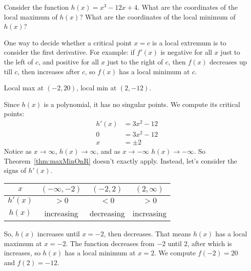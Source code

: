 
\begin{Mquestion}[2015Q]\label{s3.5.3firstderivfirst}
Consider the function $h(x)=x^3-12x+4$.
What are the coordinates of the local maximum of $h(x)$? What are the coordinates of the local minimum of $h(x)$?
\end{Mquestion}
\begin{hint}
One way to decide whether a critical point $x=c$ is a local extremum is to consider the first derivative. For example: if $f'(x)$ is negative for all $x$ just to the left of $c$, and positive for all $x$ just to the right of $c$, then $f(x)$ decreases up till $c$, then increases after $c$, so $f(x)$ has a local minimum at $c$.
\end{hint}
\begin{answer} Local max at $(-2,20)$, local min at $(2,-12)$.
\end{answer}
\begin{solution}
Since $h(x)$ is a polynomial, it has no singular points. We compute its critical points:
\begin{align*}
h'(x)&=3x^2-12\\
0&=3x^2-12\\
x&=\pm 2
\end{align*}
Notice as $x\to\infty$, $h(x)\to\infty$, and as $x\to-\infty$ $h(x)\to-\infty$. So Theorem~\ref*{thm:maxMinOnR} doesn't exactly apply. Instead, let's consider the signs of $h'(x)$.

\begin{center}
\begin{tabular}{|c||c|c|c|}
\hline
$x$ & $(-\infty,-2)$ &  $(-2,2)$ &  $(2,\infty)$  \\
\hline
$h'(x)$ & $>0$ & $<0$ & $>0$ \\
\hline
$h(x)$ & increasing & decreasing & increasing  \\
\hline
\end{tabular}
\end{center}
So, $h(x)$ increases until $x=-2$, then decreases. That means $h(x)$ has a local maximum at $x=-2$. The function decreases from $-2$ until $2$, after which is increases, so $h(x)$ has a local minimum at $x=2$.
We compute $f(-2)=20$ and $f(2)=-12$.
\end{solution}



